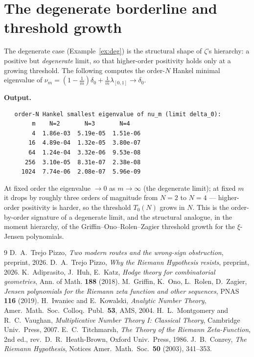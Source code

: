 \documentclass[11pt]{amsart}
\theoremstyle{definition}
\theoremstyle{remark}
\begin{document}
\section{The degenerate borderline and threshold growth}\label{app:deg}
The degenerate case (Example~\ref{ex:deg}) is the structural shape of $\zeta$'s
hierarchy: a positive but \emph{degenerate} limit, so that higher-order
positivity holds only at a growing threshold. The following computes the
order-$N$ Hankel minimal eigenvalue of $\nu_m=(1-\tfrac1m)\delta_0+\tfrac1m
\lambda_{[0,1]}\to\delta_0$.

\noindent\textbf{Output.}
\begin{lstlisting}
   order-N Hankel smallest eigenvalue of nu_m (limit delta_0):
        m    N=2       N=3       N=4
        4  1.86e-03  5.19e-05  1.51e-06
       16  4.89e-04  1.32e-05  3.80e-07
       64  1.24e-04  3.32e-06  9.53e-08
      256  3.10e-05  8.31e-07  2.38e-08
     1024  7.74e-06  2.08e-07  5.96e-09
\end{lstlisting}
At fixed order the eigenvalue $\to0$ as $m\to\infty$ (the degenerate limit); at
fixed $m$ it drops by roughly three orders of magnitude from $N=2$ to $N=4$ ---
higher-order positivity is harder, so the threshold $T_0(N)$ grows in $N$. This is
the order-by-order signature of a degenerate limit, and the structural analogue,
in the moment hierarchy, of the Griffin--Ono--Rolen--Zagier threshold growth for
the $\xi$-Jensen polynomials.

\begin{thebibliography}{9}
 D.~A.~Trejo Pizzo, \emph{Two modern routes and the wrong-sign obstruction}, preprint, 2026.
 D.~A.~Trejo Pizzo, \emph{Why the Riemann Hypothesis resists}, preprint, 2026.
 K.~Adiprasito, J.~Huh, E.~Katz, \emph{Hodge theory for combinatorial geometries}, Ann. of Math. \textbf{188} (2018).
 M.~Griffin, K.~Ono, L.~Rolen, D.~Zagier, \emph{Jensen polynomials for the Riemann zeta function and other sequences}, PNAS \textbf{116} (2019).
 H.~Iwaniec and E.~Kowalski, \emph{Analytic Number Theory}, Amer.\ Math.\ Soc.\ Colloq.\ Publ.\ \textbf{53}, AMS, 2004.
 H.~L.~Montgomery and R.~C.~Vaughan, \emph{Multiplicative Number Theory I: Classical Theory}, Cambridge Univ.\ Press, 2007.
 E.~C.~Titchmarsh, \emph{The Theory of the Riemann Zeta-Function}, 2nd ed., rev.\ D.~R.~Heath-Brown, Oxford Univ.\ Press, 1986.
 J.~B.~Conrey, \emph{The Riemann Hypothesis}, Notices Amer.\ Math.\ Soc.\ \textbf{50} (2003), 341--353.
\end{thebibliography}
\end{document}
